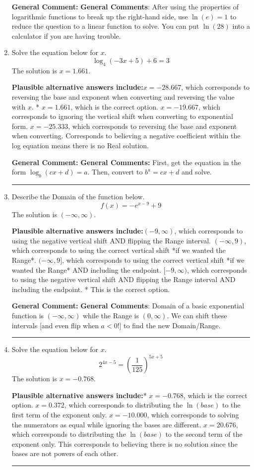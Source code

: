 \documentclass{extbook}[14pt]
\newcommand{\litem}[1]{\item #1

\rule{\textwidth}{0.4pt}}
\begin{document}
\begin{enumerate}
{\textbf{General Comment:} \textbf{General Comments}: After using the properties of logarithmic functions to break up the right-hand side, use $\ln(e) = 1$ to reduce the question to a linear function to solve. You can put $\ln(28)$ into a calculator if you are having trouble.
}
\litem{
Solve the equation below for $x$.
\[ \log_{4}{(-3x+5)}+6 = 3 \]The solution is \( x = 1.661 \).\begin{enumerate}[label=\Alph*.]
\textbf{Plausible alternative answers include:}$x = -28.667$, which corresponds to reversing the base and exponent when converting and reversing the value with $x$.
* $x = 1.661$, which is the correct option.
$x = -19.667$, which corresponds to ignoring the vertical shift when converting to exponential form.
$x = -25.333$, which corresponds to reversing the base and exponent when converting.
Corresponds to believing a negative coefficient within the log equation means there is no Real solution.
\end{enumerate}

\textbf{General Comment:} \textbf{General Comments:} First, get the equation in the form $\log_b{(cx+d)} = a$. Then, convert to $b^a = cx+d$ and solve.
}
\litem{
Describe the Domain of the function below.
\[ f(x) = -e^{x-9}+9 \]The solution is \( (-\infty, \infty) \).\begin{enumerate}[label=\Alph*.]
\textbf{Plausible alternative answers include:}$(-9, \infty)$, which corresponds to using the negative vertical shift AND flipping the Range interval.
$(-\infty, 9)$, which corresponds to using the correct vertical shift *if we wanted the Range*.
$(-\infty, 9]$, which corresponds to using the correct vertical shift *if we wanted the Range* AND including the endpoint.
$[-9, \infty)$, which corresponds to using the negative vertical shift AND flipping the Range interval AND including the endpoint.
* This is the correct option.
\end{enumerate}

\textbf{General Comment:} \textbf{General Comments}: Domain of a basic exponential function is $(-\infty, \infty)$ while the Range is $(0, \infty)$. We can shift these intervals [and even flip when $a<0$!] to find the new Domain/Range.
}
\litem{
Solve the equation below for $x$.
\[ 2^{4x-5} = \left(\frac{1}{125}\right)^{5x+5} \]The solution is \( x = -0.768 \).\begin{enumerate}[label=\Alph*.]
\textbf{Plausible alternative answers include:}* $x = -0.768$, which is the correct option.
$x = 0.372$, which corresponds to distributing the $\ln(base)$ to the first term of the exponent only.
$x = -10.000$, which corresponds to solving the numerators as equal while ignoring the bases are different.
$x = 20.676$, which corresponds to distributing the $\ln(base)$ to the second term of the exponent only.
This corresponds to believing there is no solution since the bases are not powers of each other.
\end{enumerate}

}
\end{enumerate}
\end{document}
